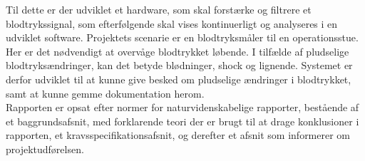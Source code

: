 Til dette er der udviklet et hardware, som skal forstærke og filtrere et blodtrykssignal, som efterfølgende skal vises kontinuerligt og analyseres i en udviklet software. Projektets scenarie er en blodtryksmåler til en operationsstue. Her er det nødvendigt at overvåge blodtrykket løbende. I tilfælde af pludselige blodtryksændringer, kan det betyde blødninger, shock og lignende. Systemet er derfor udviklet til at kunne give besked om pludselige ændringer i blodtrykket, samt at kunne gemme dokumentation herom. \\[1ex]
Rapporten er opsat efter normer for naturvidenskabelige rapporter, bestående af et baggrundsafsnit, med forklarende teori der er brugt til at drage konklusioner i rapporten, et kravsspecifikationsafsnit, og derefter et afsnit som informerer om projektudførelsen. \\[1ex]


  
